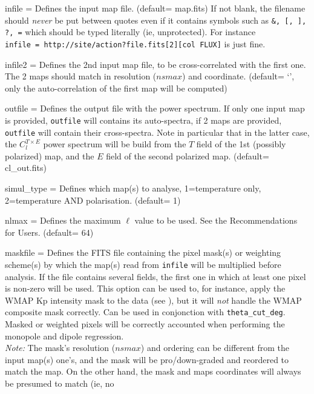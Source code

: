 \begin{qualifiers}
  \begin{qulist}{} %
    \item[{infile = }] Defines the input map file. 
	(default= map.fits)
	If not blank, the filename should {\em never} be put between quotes even if it contains
symbols such as {\tt \&, [, ], ?, =} which should be typed literally (ie, unprotected). For instance
 {\tt infile~=~http://site/action?file.fits[2][col FLUX]} is just fine.
    \item[{infile2 = }] Defines the 2nd input map file, to be cross-correlated with
	the first one. The 2 maps should match in resolution ($nsmax$) and coordinate.
	(default= `', only the auto-correlation of the first map will be computed)
    \item[{outfile = }] Defines the output file with the power spectrum. If only
      one input map is provided, {\tt outfile} will contains its auto-spectra,
      if 2 maps are provided, {\tt outfile} will contain their
      cross-spectra. Note in particular that in the latter case, the $C^{T\times E}_l$ power
      spectrum will be build from the $T$ field of the 1st (possibly polarized) map, and the $E$
      field of the second polarized map.
(default= cl\_out.fits)
     \item[{simul\_type = }] Defines which map(s) to analyse, 1=temperature only, 2=temperature AND polarisation.
(default= 1)
     \item[{nlmax = }] Defines the maximum $\ell$ value 
to be used. See the Recommendations for Users. 
(default= 64)
 \item[{maskfile =}] Defines the FITS file containing the pixel mask(s) or
 weighting scheme(s) by which the map(s) read from {\tt infile} will be
 multiplied before analysis. If the file contains several fields, the first
one in which at least one pixel is non-zero will be used. This option can be
 used to, for instance, apply
the WMAP Kp intensity mask to the data (see
), but it will {\em not} handle the WMAP composite mask correctly.
Can be used in conjonction with {\tt theta\_cut\_deg}. Masked or weighted pixels
 will be correctly accounted when performing the monopole and dipole regression.\\
{\em Note:} The mask's resolution ($nsmax$) and ordering can be different from the input map(s)
one's, and the mask will be pro/down-graded and reordered to match the map. On the
other hand, the mask and maps coordinates will always be presumed to match (ie, no

\end{qulist}
\end{qualifiers}
